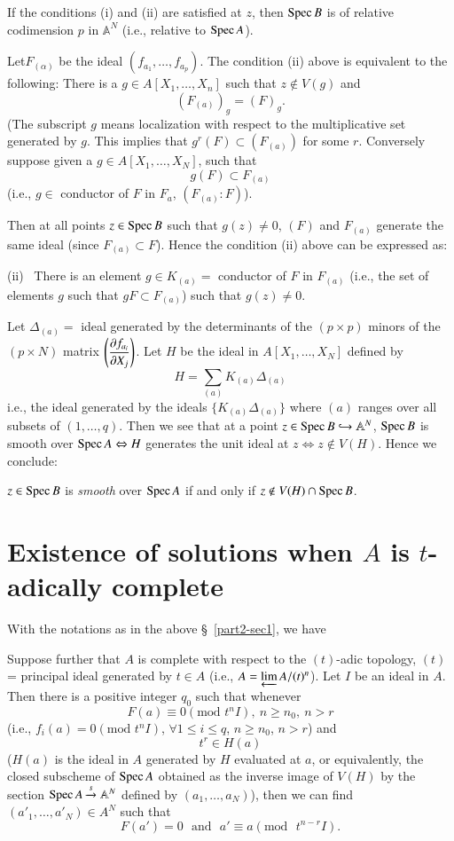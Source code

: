 If the conditions (i) and (ii) are satisfied at $z$, then $\operatorname{Spec} B$ is
of relative codimension $p$ in $\mathbb{A}^{N}$ (i.e., relative to
$\operatorname{Spec} A$). 

Let\pageoriginale $F_{(\alpha)}$ be the ideal
$(f_{a_{1}},\ldots,f_{a_{p}})$. The condition (ii) above is equivalent
to the following: There is a $g\in A[X_{1},\ldots,X_{n}]$ such that
$z \not\in V(g)$ and
$$
(F_{(a)})_{g}=(F)_{g}.
$$
(The subscript $g$ means localization with respect to the
multiplicative set generated by $g$. This implies that
$g^{r}(F)\subset (F_{(a)})$ for some $r$. Conversely suppose given a
$g\in A[X_{1},\ldots,X_{N}]$, such that 
$$
g(F)\subset F_{(a)}
$$
(i.e., $g\in$ conductor of $F$ in $F_{a}$, $(F_{(a)}:F)$).

Then at all points $z\in \operatorname{Spec} B$ such that $g(z)\neq 0$, $(F)$ and
$F_{(a)}$ generate the same ideal (since $F_{(a)}\subset F$). Hence
the condition (ii) above can be expressed as:

(ii)~ There is an element $g\in K_{(a)}=$ conductor of $F$ in
$F_{(a)}$ (i.e., the set of elements $g$ such that $gF\subset
F_{(a)}$) such that $g(z)\neq 0$.

Let $\Delta_{(a)}=$ ideal generated by the determinants of the
$(p\times p)$ minors of the $(p\times N)$ matrix $\left(\dfrac{\partial
  f_{a_{i}}}{\partial X_{j}}\right)$. Let $H$ be the ideal in
$A[X_{1},\ldots,X_{N}]$ defined by
$$
H=\sum_{(a)}K_{(a)}\Delta_{(a)}
$$
i.e., the ideal generated by the ideals $\{K_{(a)}\Delta_{(a)}\}$
where $(a)$ ranges over all subsets of $(1,\ldots,q)$. Then we see
that at a point $z\in \operatorname{Spec} B\hookrightarrow \mathbb{A}^{N}$, $\operatorname{Spec}
B$ is smooth over $\operatorname{Spec} A\Leftrightarrow H$ generates the unit ideal
at $z\Leftrightarrow z\not\in V(H)$. Hence we conclude:

$z\in \operatorname{Spec} B$ is {\em smooth} over $\operatorname{Spec} A$ if and only if $z\not\in
V(H)\cap \operatorname{Spec} B$. 

\section{Existence of solutions when $A$ is $t$-adically
  complete}\label{part2-sec2}\pageoriginale

With the notations as in the above \S\ \ref{part2-sec1}, we have

\begin{theorem}\label{part2-thm2.1}
Suppose further that $A$ is complete with respect to the $(t)$-adic
topology, $(t)$ = principal ideal generated by $t\in A$ (i.e.,
$A=\varprojlim A/(t)^{n}$). Let $I$ be an ideal in $A$. Then there is
a positive integer $q_{0}$ such that whenever
$$
F(a)\equiv 0(\text{mod~}t^{n}I),\ n\geq n_{0},\ n>r
$$
(i.e., $f_{i}(a)=0(\text{mod~}t^{n}I)$, $\forall 1\leq i\leq q$,
$n\geq n_{0}$, $n>r$) and
$$
t^{r}\in H(a)
$$
($H(a)$ is the ideal in $A$ generated by $H$ evaluated at $a$, or
equivalently, the closed subscheme of $\operatorname{Spec} A$ obtained as the
inverse image of $V(H)$ by the section $\operatorname{Spec}
A\xrightarrow{s}\mathbb{A}^{N}$ defined by $(a_{1},\ldots,a_{N})$),
then we can find $(a'_{1},\ldots,a'_{N})\in A^{N}$ such that
$$
F(a')=0\text{~ and~ } a'\equiv a(\text{mod~ } t^{n-r}I). 
$$
\end{theorem}

